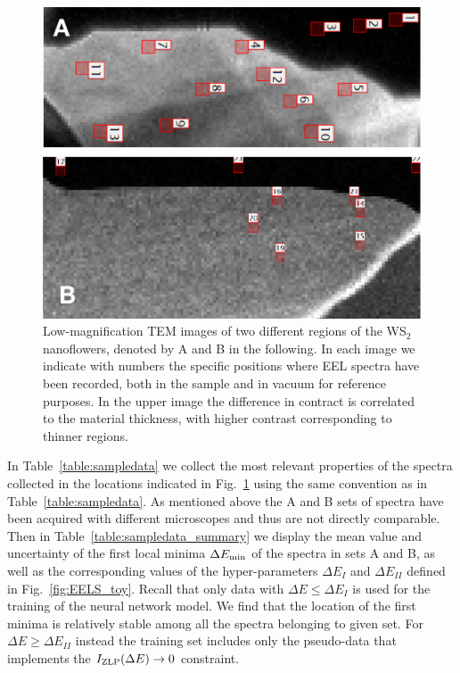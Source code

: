 \begin{figure}[t]
\begin{centering}
  \includegraphics[width=0.87\linewidth]{plots/Spectra_location.pdf}
  \caption{Low-magnification TEM images of two different regions of
    the WS$_2$ nanoflowers, denoted by A and B in the following.
    In each image we indicate with numbers the specific positions where
    EEL spectra have been recorded, both in the sample and in vacuum for
    reference purposes.
    In the upper image the difference in contract is correlated to the material
    thickness, with higher contrast corresponding to thinner regions.
  }
\label{fig:ws2positions}
\end{centering}
\end{figure}

In Table~\ref{table:sampledata} we collect the most relevant properties of the spectra collected
in the locations indicated in Fig.~\ref{fig:ws2positions} using the same convention as
in Table~\ref{table:sampledata}.
%
As mentioned above the A and B sets of spectra have been acquired with different microscopes and thus are
not directly comparable.
%
Then in Table~\ref{table:sampledata_summary} we display
the mean value and uncertainty of the first local minima $\Delta E_{\rm min}$
    of the spectra in sets A and B, as well as the corresponding values of the hyper-parameters
    $\Delta E_I$ and $\Delta E_{II}$ defined in Fig.~\ref{fig:EELS_toy}.
    Recall that only data with $\Delta E \le \Delta E_I$ is used for the training
    of the neural network model.
    We find that the location of the first minima is relatively stable
    among all the spectra belonging to given set.
    For $\Delta E \ge \Delta E_{II}$ instead the training set includes only the pseudo-data
    that implements the $I_{\rm ZLP}(\Delta E)\to 0$ constraint.

